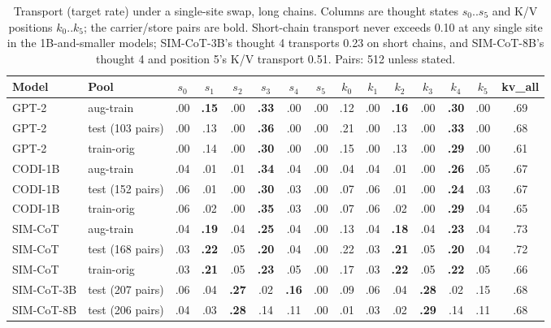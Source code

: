 \documentclass{article}
\begin{document}
\begin{table}[h]
\caption{Transport (target rate) under a single-site swap, long chains. Columns are thought states $s_0..s_5$ and K/V positions $k_0..k_5$; the carrier/store pairs are bold. Short-chain transport never exceeds 0.10 at any single site in the 1B-and-smaller models; SIM-CoT-3B's thought 4 transports 0.23 on short chains, and SIM-CoT-8B's thought 4 and position 5's K/V transport 0.51. Pairs: 512 unless stated.}
\label{tab:transport}
\centering
\scriptsize
\setlength{\tabcolsep}{3pt}
\begin{tabular}{llcccccc|cccccc|c}
\toprule
Model & Pool & $s_0$ & $s_1$ & $s_2$ & $s_3$ & $s_4$ & $s_5$ & $k_0$ & $k_1$ & $k_2$ & $k_3$ & $k_4$ & $k_5$ & kv\_all \\
\midrule
GPT-2 & aug-train & .00 & \textbf{.15} & .00 & \textbf{.33} & .00 & .00 & .12 & .00 & \textbf{.16} & .00 & \textbf{.30} & .00 & .69 \\
GPT-2 & test (103 pairs) & .00 & .13 & .00 & \textbf{.36} & .00 & .00 & .21 & .00 & .13 & .00 & \textbf{.33} & .00 & .68 \\
GPT-2 & train-orig & .00 & .14 & .00 & \textbf{.30} & .00 & .00 & .15 & .00 & .13 & .00 & \textbf{.29} & .00 & .61 \\
CODI-1B & aug-train & .04 & .01 & .01 & \textbf{.34} & .04 & .00 & .04 & .04 & .01 & .00 & \textbf{.26} & .05 & .67 \\
CODI-1B & test (152 pairs) & .06 & .01 & .00 & \textbf{.30} & .03 & .00 & .07 & .06 & .01 & .00 & \textbf{.24} & .03 & .67 \\
CODI-1B & train-orig & .06 & .02 & .00 & \textbf{.35} & .03 & .00 & .07 & .06 & .02 & .00 & \textbf{.29} & .04 & .65 \\
SIM-CoT & aug-train & .04 & \textbf{.19} & .04 & \textbf{.25} & .04 & .00 & .13 & .04 & \textbf{.18} & .04 & \textbf{.23} & .04 & .73 \\
SIM-CoT & test (168 pairs) & .03 & \textbf{.22} & .05 & \textbf{.20} & .04 & .00 & .22 & .03 & \textbf{.21} & .05 & \textbf{.20} & .04 & .72 \\
SIM-CoT & train-orig & .03 & \textbf{.21} & .05 & \textbf{.23} & .05 & .00 & .17 & .03 & \textbf{.22} & .05 & \textbf{.22} & .05 & .66 \\
SIM-CoT-3B & test (207 pairs) & .06 & .04 & \textbf{.27} & .02 & \textbf{.16} & .00 & .09 & .06 & .04 & \textbf{.28} & .02 & .15 & .68 \\
SIM-CoT-8B & test (206 pairs) & .04 & .03 & \textbf{.28} & .14 & .11 & .00 & .01 & .03 & .02 & \textbf{.29} & .14 & .11 & .68 \\
\bottomrule
\end{tabular}
\end{table}
\end{document}
